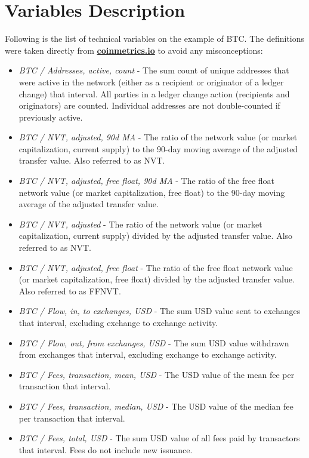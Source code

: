 \chapter{Variables Description}
\label{app:var_desc}
Following is the list of technical variables on the example of \ac{BTC}. The definitions were taken
directly from \textbf{\href{https://charts.coinmetrics.io/crypto-data/}{coinmetrics.io}} to avoid any misconceptions:

\begin{itemize}
    \item \textit{BTC / Addresses, active, count} - The sum count of unique addresses that were active in the network (either as a recipient or originator of a ledger change) that interval. All parties in a ledger change action (recipients and originators) are counted. Individual addresses are not double-counted if previously active.
    \item \textit{BTC / NVT, adjusted, 90d MA} - The ratio of the network value (or market capitalization, current supply) to the 90-day moving average of the adjusted transfer value. Also referred to as NVT.
    \item \textit{BTC / NVT, adjusted, free float,  90d MA} - The ratio of the free float network value (or market capitalization, free float) to the 90-day moving average of the adjusted transfer value.
    \item \textit{BTC / NVT, adjusted} - The ratio of the network value (or market capitalization, current supply) divided by the adjusted transfer value. Also referred to as NVT.
    \item \textit{BTC / NVT, adjusted, free float} - The ratio of the free float network value (or market capitalization, free float) divided by the adjusted transfer value. Also referred to as FFNVT.
    \item \textit{BTC / Flow, in, to exchanges, USD} - The sum USD value sent to exchanges that interval, excluding exchange to exchange activity.
    \item \textit{BTC / Flow, out, from exchanges, USD} - The sum USD value withdrawn from exchanges that interval, excluding exchange to exchange activity.
    \item \textit{BTC / Fees, transaction, mean, USD} - The USD value of the mean fee per transaction that interval.
    \item \textit{BTC / Fees, transaction, median, USD} - The USD value of the median fee per transaction that interval.
    \item \textit{BTC / Fees, total, USD} - The sum USD value of all fees paid by transactors that interval. Fees do not include new issuance.

\end{itemize}
